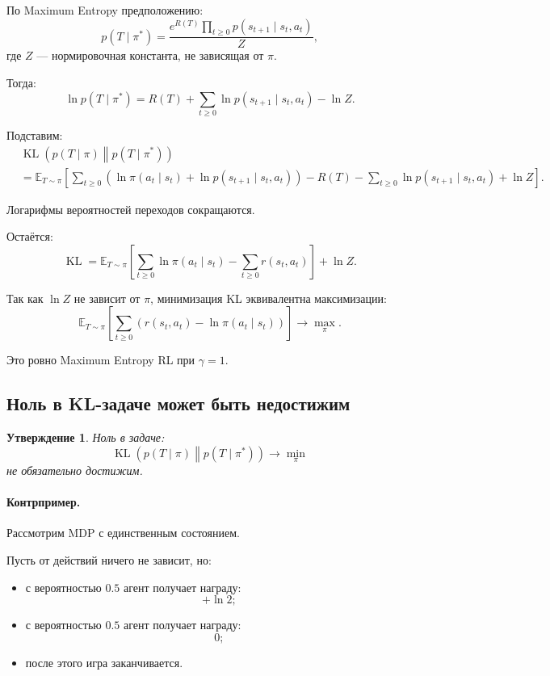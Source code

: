 \documentclass[12pt,a4paper]{article}
\newtheorem{statement}{Утверждение}
\begin{document}
По Maximum Entropy предположению:
\[
p(T\mid\pi^\ast)
=
\frac{
e^{R(T)}
\prod_{t\ge 0}
p(s_{t+1}\mid s_t,a_t)
}{
Z
},
\]
где $Z$ --- нормировочная константа, не зависящая от $\pi$.

Тогда:
\[
\ln p(T\mid\pi^\ast)
=
R(T)
+
\sum_{t\ge 0}
\ln p(s_{t+1}\mid s_t,a_t)
-
\ln Z.
\]

Подставим:
\[
\begin{aligned}
&
\operatorname{KL}
\left(
p(T\mid \pi)
\middle\|
p(T\mid \pi^\ast)
\right)
\\
&=
\mathbb E_{T\sim\pi}
\left[
\sum_{t\ge 0}
\left(
\ln\pi(a_t\mid s_t)
+
\ln p(s_{t+1}\mid s_t,a_t)
\right)
-
R(T)
-
\sum_{t\ge 0}
\ln p(s_{t+1}\mid s_t,a_t)
+
\ln Z
\right].
\end{aligned}
\]

Логарифмы вероятностей переходов сокращаются.

Остаётся:
\[
\operatorname{KL}
=
\mathbb E_{T\sim\pi}
\left[
\sum_{t\ge 0}
\ln\pi(a_t\mid s_t)
-
\sum_{t\ge 0}
r(s_t,a_t)
\right]
+
\ln Z.
\]

Так как $\ln Z$ не зависит от $\pi$, минимизация KL эквивалентна максимизации:
\[
\mathbb E_{T\sim\pi}
\left[
\sum_{t\ge 0}
\left(
r(s_t,a_t)
-
\ln\pi(a_t\mid s_t)
\right)
\right]
\to
\max_\pi.
\]

Это ровно Maximum Entropy RL при $\gamma=1$.

\subsection{Ноль в KL-задаче может быть недостижим}

\begin{statement}
Ноль в задаче:
\[
\operatorname{KL}
\left(
p(T\mid \pi)
\middle\|
p(T\mid \pi^\ast)
\right)
\to
\min_\pi
\]
не обязательно достижим.
\end{statement}

\paragraph{Контрпример.}

Рассмотрим MDP с единственным состоянием.

Пусть от действий ничего не зависит, но:
\begin{itemize}
    \item с вероятностью $0.5$ агент получает награду:
    \[
    +\ln 2;
    \]
    \item с вероятностью $0.5$ агент получает награду:
    \[
    0;
    \]
    \item после этого игра заканчивается.
\end{itemize}
\end{document}
